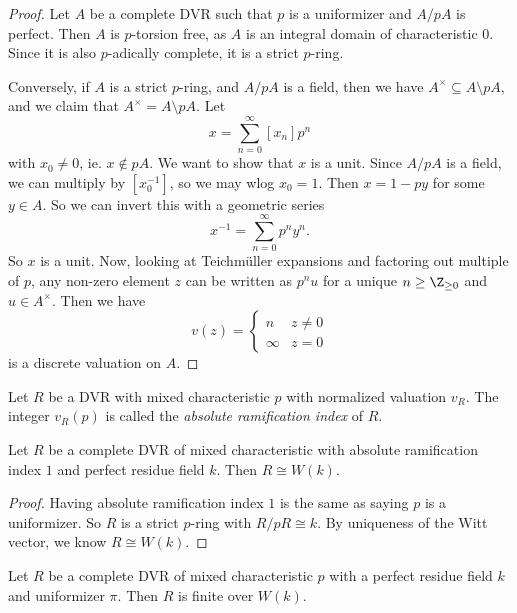 \documentclass[a4paper]{article}
\begin{document}
\begin{proof}
  Let $A$ be a complete DVR such that $p$ is a uniformizer and $A/pA$ is perfect. Then $A$ is $p$-torsion free, as $A$ is an integral domain of characteristic $0$. Since it is also $p$-adically complete, it is a strict $p$-ring.

  Conversely, if $A$ is a strict $p$-ring, and $A/pA$ is a field, then we have $A^\times \subseteq A \setminus pA$, and we claim that $A^\times = A \setminus pA$. Let
  \[
    x = \sum_{n = 0}^\infty [x_n] p^n
  \]
  with $x_0 \not= 0$, ie. $x \not\in pA$. We want to show that $x$ is a unit. Since $A/pA$ is a field, we can multiply by $[x_0^{-1}]$, so we may wlog $x_0 = 1$. Then $x = 1 - py$ for some $y \in A$. So we can invert this with a geometric series
  \[
    x^{-1} = \sum_{n = 0}^\infty p^n y^n.
  \]
  So $x$ is a unit. Now, looking at Teichm\"uller expansions and factoring out multiple of $p$, any non-zero element $z$ can be written as $p^n u$ for a unique $n \geq \Z_{\geq 0}$ and $u \in A^\times$. Then we have
  \[
    v(z) =
    \begin{cases}
      n & z \not= 0\\
      \infty & z = 0
    \end{cases}
  \]
  is a discrete valuation on $A$.
\end{proof}

\begin{defi}
  Let $R$ be a DVR with mixed characteristic $p$ with normalized valuation $v_R$. The integer $v_R(p)$ is called the \emph{absolute ramification index} of $R$.
\end{defi}

\begin{cor}
  Let $R$ be a complete DVR of mixed characteristic with absolute ramification index $1$ and perfect residue field $k$. Then $R \cong W(k)$.
\end{cor}

\begin{proof}
  Having absolute ramification index $1$ is the same as saying $p$ is a uniformizer. So $R$ is a strict $p$-ring with $R/pR \cong k$. By uniqueness of the Witt vector, we know $R \cong W(k)$.
\end{proof}

\begin{thm}
  Let $R$ be a complete DVR of mixed characteristic $p$ with a perfect residue field $k$ and uniformizer $\pi$. Then $R$ is finite over $W(k)$.
\end{thm}
\end{document}
